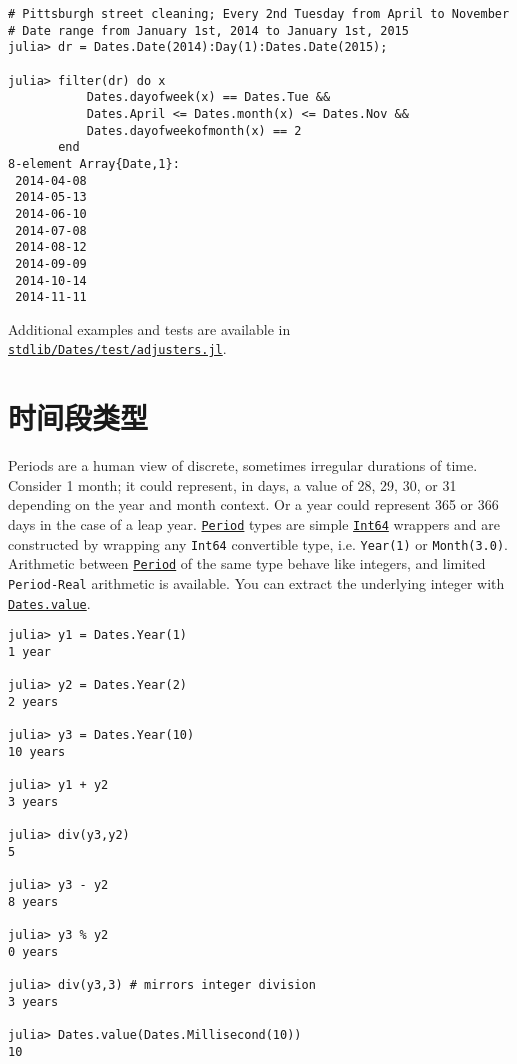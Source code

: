 \begin{verbatim}
# Pittsburgh street cleaning; Every 2nd Tuesday from April to November
# Date range from January 1st, 2014 to January 1st, 2015
julia> dr = Dates.Date(2014):Day(1):Dates.Date(2015);

julia> filter(dr) do x
           Dates.dayofweek(x) == Dates.Tue &&
           Dates.April <= Dates.month(x) <= Dates.Nov &&
           Dates.dayofweekofmonth(x) == 2
       end
8-element Array{Date,1}:
 2014-04-08
 2014-05-13
 2014-06-10
 2014-07-08
 2014-08-12
 2014-09-09
 2014-10-14
 2014-11-11
\end{verbatim}



Additional examples and tests are available in \href{https://github.com/JuliaLang/julia/blob/master/stdlib/Dates/test/adjusters.jl}{\texttt{stdlib/Dates/test/adjusters.jl}}.



\hypertarget{17903801457919484645}{}


\section{时间段类型}



Periods are a human view of discrete, sometimes irregular durations of time. Consider 1 month; it could represent, in days, a value of 28, 29, 30, or 31 depending on the year and month context. Or a year could represent 365 or 366 days in the case of a leap year. \hyperlink{17624028548543163266}{\texttt{Period}} types are simple \hyperlink{7720564657383125058}{\texttt{Int64}} wrappers and are constructed by wrapping any \texttt{Int64} convertible type, i.e. \texttt{Year(1)} or \texttt{Month(3.0)}. Arithmetic between \hyperlink{17624028548543163266}{\texttt{Period}} of the same type behave like integers, and limited \texttt{Period-Real} arithmetic is available.  You can extract the underlying integer with \hyperlink{6471383377711200525}{\texttt{Dates.value}}.




\begin{verbatim}
julia> y1 = Dates.Year(1)
1 year

julia> y2 = Dates.Year(2)
2 years

julia> y3 = Dates.Year(10)
10 years

julia> y1 + y2
3 years

julia> div(y3,y2)
5

julia> y3 - y2
8 years

julia> y3 % y2
0 years

julia> div(y3,3) # mirrors integer division
3 years

julia> Dates.value(Dates.Millisecond(10))
10
\end{verbatim}



